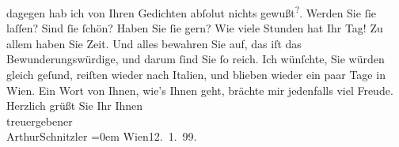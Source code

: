 \begin{ledgroupsized}[t]{13cm}
                    dagegen hab ich von Ihren Gedichten abſolut nichts gewußt\substVorne{}\textsuperscript{?}\substDazwischen{}.\substHinten{} Werden Sie ſie \label{K_L00880_5v}\label{K_L00880_5h} laſſen? Sind ſie
                    ſchön? Haben Sie ſie gern? Wie viele Stunden hat Ihr Tag! Zu allem haben Sie
                    Zeit. Und alles bewahren Sie auf, das iſt das Bewunderungswürdige, und darum {\pb}ſind Sie ſo reich.\pend
           \pstart
           Ich wünſchte, Sie würden gleich geſund, reiſten wieder nach Italien, und blieben wieder ein paar Tage in Wien. Ein Wort von Ihnen, wie’s Ihnen geht,
                    brächte mir jedenfalls viel Freude.\pend
           \pstart
           Herzlich grüßt Sie Ihr Ihnen {\\[\baselineskip]}treuergebener{\\[\baselineskip]}\spacefill\mbox{ArthurSchnitzler}\pend
           \leftskip=0em{}\pstart
           Wien12. 1. 99.\pend
           \endnumbering{}\end{ledgroupsized}  \newcommand{\dateiname}{L00880}\newcommand{\titel}{Arthur Schnitzler an Georg Brandes, 12. 1. 1899}\newcommand{\editorInnen}{Martin Anton Müller und Gerd-Hermann Susen}
      